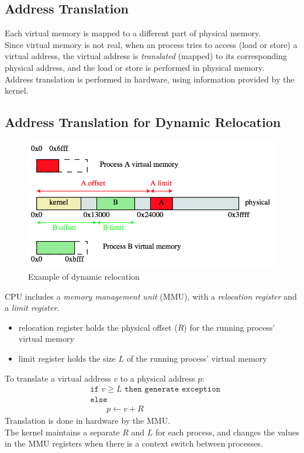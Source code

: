 \documentclass[12pt]{article}
\theoremstyle{plain}
\theoremstyle{definition}
\begin{document}
\subsection{Address Translation}
Each virtual memory is mapped to a different part of physical memory. \\
Since virtual memory is not real, when an process tries to access (load or store) a virtual address, the virtual address is \emph{translated} (mapped) to its corresponding physical address, and the load or store is performed in physical memory. \\
Address translation is performed in hardware, using information provided by the kernel.

\subsection{Address Translation for Dynamic Relocation}
\begin{figure}[H]
  \centering
  \includegraphics[scale=0.6]{pictures/dyn_reloc.png}
  \caption{Example of dynamic relocation}
  \label{fig:dyn_reloc_ex}
\end{figure}
CPU includes a \emph{memory management unit} (MMU), with a \emph{relocation register} and a \emph{limit register}.
\begin{itemize}
  \item relocation register holds the physical offset ($R$) for the running process' virtual memory
  \item limit register holds the size $L$ of the running process' virtual memory
\end{itemize}
To translate a virtual address $v$ to a physical address $p$:
\begin{align*}
&\texttt{if } v \geq L \texttt{ then generate exception} \\
&\texttt{else} \\
&\qquad p \leftarrow v + R
\end{align*}
Translation is done in hardware by the MMU. \\
The kernel maintains a separate $R$ and $L$ for each process, and changes the values in the MMU registers when there is a context switch between processes. \\
\end{document}
